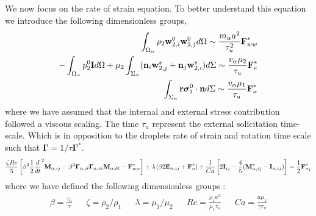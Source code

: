 We now focus on the rate of strain equation. 
To better understand this equation we introduce the following dimensionless groups, 
\begin{align*}
    \int_{\Omega_\alpha} \rho_2 \textbf{w}_{2,i}^0\textbf{w}_{2,j}^0 d\Omega
    \sim \frac{m_\alpha a^2}{\tau_u^2} \textbf{F}_{ww}^*
    \\
    - \int_{\Omega_\alpha} p_2^0\textbf{I} d\Omega
    + \mu_2 \int_{\Sigma_\alpha} (\textbf{n}_i \textbf{w}_{2,j}^s + \textbf{n}_j \textbf{w}_{2,i}^s) d\Sigma
    \sim \frac{v_\alpha \mu_2}{\tau_u} \textbf{F}_{e}^*
    \\
    \int_{\Sigma_\alpha} \textbf r \bm\sigma_1^0 \cdot \textbf{n} d\Sigma
    \sim 
    \frac{v_\alpha \mu_1}{\tau_u} \textbf{F}_{\sigma}^*
\end{align*} 
where we have assumed that the internal and external stress contribution followed a viscous scaling. 
The time $\tau_u$ represent the external solicitation time-scale. 
Which is in opposition to the droplets rate of strain and rotation time scale such that $\bm\Gamma = 1/\tau \bm\Gamma^*$. 
\begin{align*}
    \frac{\zeta Re}{5}\left[
        \beta^2 \frac{1}{2}\frac{d}{d t}^2 \textbf{M}_{\alpha,ij}
    -   \beta^2 \bm\Gamma_{\alpha,jl}\bm\Gamma_{\alpha,ik} \textbf{M}_{\alpha,kl}  
    - \textbf{F}_{ww}^*
    \right]
    + \lambda  \left[
        \beta 2\textbf{E}_{\alpha,ij}
    +  \textbf{F}_\sigma^*
    \right]
    + \frac{1}{Ca} \left[
    2\textbf{I}_{ij} 
    - \frac{4  }{5} (\textbf{M}_{\alpha,ij}^* - \textbf{I}_{\alpha,ij})
    \right]
    = 
    \frac{1}{2}
    \textbf{F}_{\sigma_1}^*
\end{align*}
where we have defined the following dimensionless groups : 
\begin{align*}
    \beta = \frac{\tau_u}{\tau}
    && \zeta = \rho_2 /\rho_1
    && \lambda = \mu_1/\mu_2 
    && Re = \frac{\rho_1 a^2 }{ \mu_1 \tau_u}
    && Ca = \frac{a \mu_1}{\gamma \tau_u}
\end{align*}

